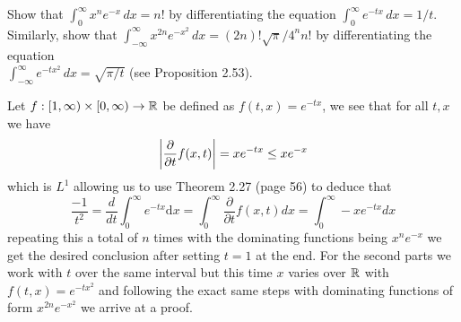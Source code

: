 \documentclass[12pt,a4paper]{article}
\begin{document}
\begin{problem}\label{prob:2-29}
	Show that $\int_0^\infty x^n e^{-x} \, dx = n!$ by differentiating the equation $\int_0^\infty e^{-tx} \, dx = 1/t$. Similarly, show that $\int_{-\infty}^\infty x^{2n}e^{-x^2}\, dx = (2n)!\sqrt{\pi}/4^nn!$ by differentiating the equation\\ $\int_{-\infty}^\infty e^{-tx^2} \, dx = \sqrt{\pi/t}$ (see Proposition 2.53).
\end{problem}
\begin{solution}
	Let $f:[1,\infty)\times[0,\infty)\to\mathbb{R}$ be defined as $f(t,x)=e^{-tx}$, we see that for all $t,x$ we have
	\[
		\qty|\frac{\partial}{\partial t}f(x,t)| = xe^{-tx}\leq xe^{-x}
	\]
	which is $L^1$ allowing us to use Theorem 2.27 (page 56) to deduce that
	\[
		\frac{-1}{t^2}=\frac{d}{dt}\int_{0}^{\infty}e^{-tx}\mathrm{d}x = \int_0^\infty\frac{\partial}{\partial t}f(x,t)dx=\int_0^\infty -xe^{-tx}dx
	\]
	repeating this a total of $n$ times with the dominating functions being $x^ne^{-x}$ we get the desired conclusion after setting $t=1$ at the end. 
	For the second parts we work with $t$ over the same interval but this time $x$ varies over $\mathbb{R}$ with $f(t,x)=e^{-tx^2}$ and following the exact same steps with dominating functions of form $x^{2n}e^{-x^2}$ we arrive at a proof.
\end{solution}
\end{document}
